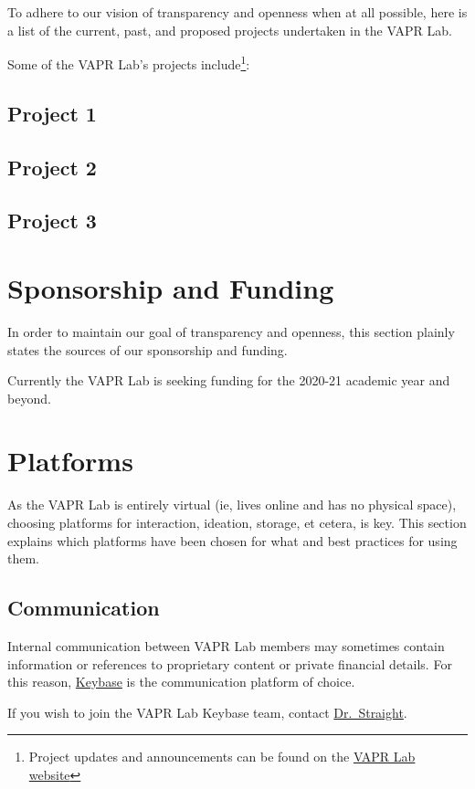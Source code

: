 \documentclass[12pt,]{memoir}
\let\rmarkdownfootnote\footnote%
\def\footnote{\protect\rmarkdownfootnote}
\begin{document}
To adhere to our vision of transparency and openness when at all possible, here is a list of the current, past, and proposed projects undertaken in the VAPR Lab.

Some of the VAPR Lab's projects include\footnote{Project updates and announcements can be found on the \href{https://VAPR-Lab.github.io/website/}{VAPR Lab website}}:

\hypertarget{project-1}{%
\section{Project 1}\label{project-1}}

\hypertarget{project-2}{%
\section{Project 2}\label{project-2}}

\hypertarget{project-3}{%
\section{Project 3}\label{project-3}}

\hypertarget{funding}{%
\chapter{Sponsorship and Funding}\label{funding}}

In order to maintain our goal of transparency and openness, this section plainly states the sources of our sponsorship and funding.

Currently the VAPR Lab is seeking funding for the 2020-21 academic year and beyond.

\hypertarget{platforms}{%
\chapter{Platforms}\label{platforms}}

As the VAPR Lab is entirely virtual (ie, lives online and has no physical space), choosing platforms for interaction, ideation, storage, et cetera, is key. This section explains which platforms have been chosen for what and best practices for using them.

\hypertarget{communication}{%
\section{Communication}\label{communication}}

Internal communication between VAPR Lab members may sometimes contain information or references to proprietary content or private financial details. For this reason, \href{https://keybase.io}{Keybase} is the communication platform of choice.

If you wish to join the VAPR Lab Keybase team, contact \href{https://keybase.io/ryanstraight}{Dr.~Straight}.


\end{document}

